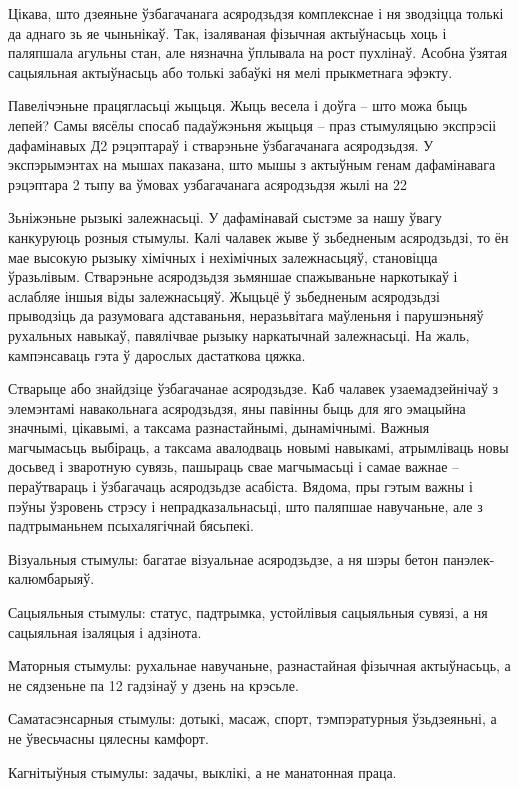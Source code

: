 Цікава, што дзеяньне ўзбагачанага асяродзьдзя комплекснае і ня зводзіцца толькі да аднаго зь яе чыньнікаў. Так, ізаляваная фізычная актыўнасьць хоць і паляпшала агульны стан, але нязначна ўплывала на рост пухлінаў. Асобна ўзятая сацыяльная актыўнасьць або толькі забаўкі ня мелі прыкметнага эфэкту. 

Павелічэньне працягласьці жыцьця. Жыць весела і доўга – што можа быць лепей? Самы вясёлы спосаб падаўжэньня жыцьця – праз стымуляцыю экспрэсіі дафамінавых Д2 рэцэптараў і стварэньне ўзбагачанага асяродзьдзя. У экспэрымэнтах на мышах паказана, што мышы з актыўным генам дафамінавага рэцэптара 2 тыпу ва ўмовах узбагачанага асяродзьдзя жылі на 22%

Зьніжэньне рызыкі залежнасьці. У дафамінавай сыстэме за нашу ўвагу канкуруюць розныя стымулы. Калі чалавек жыве ў зьбедненым асяродзьдзі, то ён мае высокую рызыку хімічных і нехімічных залежнасьцяў, становіцца ўразьлівым. Стварэньне асяродзьдзя зьмяншае спажываньне наркотыкаў і аслабляе іншыя віды залежнасьцяў. Жыцьцё ў зьбедненым асяродзьдзі прыводзіць да разумовага адставаньня, неразьвітага маўленьня і парушэньняў рухальных навыкаў, павялічвае рызыку наркатычнай залежнасьці. На жаль, кампэнсаваць гэта ў дарослых дастаткова цяжка.

Стварыце або знайдзіце ўзбагачанае асяродзьдзе. Каб чалавек узаемадзейнічаў з элемэнтамі навакольнага асяродзьдзя, яны павінны быць для яго эмацыйна значнымі, цікавымі, а таксама разнастайнымі, дынамічнымі. Важныя магчымасьць выбіраць, а таксама авалодваць новымі навыкамі, атрымліваць новы досьвед і зваротную сувязь, пашыраць свае магчымасьці і самае важнае – пераўтвараць і ўзбагачаць асяродзьдзе асабіста. Вядома, пры гэтым важны і пэўны ўзровень стрэсу і непрадказальнасьці, што паляпшае навучаньне, але з падтрыманьнем псыхалягічнай бясьпекі. 

Візуальныя стымулы: багатае візуальнае асяродзьдзе, а ня шэры бетон панэлек-калюмбарыяў. 

Сацыяльныя стымулы: статус, падтрымка, устойлівыя сацыяльныя сувязі, а ня сацыяльная ізаляцыя і адзінота. 

Маторныя стымулы: рухальнае навучаньне, разнастайная фізычная актыўнасьць, а не сядзеньне па 12 гадзінаў у дзень на крэсьле. 

Саматасэнсарныя стымулы: дотыкі, масаж, спорт, тэмпэратурныя ўзьдзеяньні, а не ўвесьчасны цялесны камфорт.

Кагнітыўныя стымулы: задачы, выклікі, а не манатонная праца.

